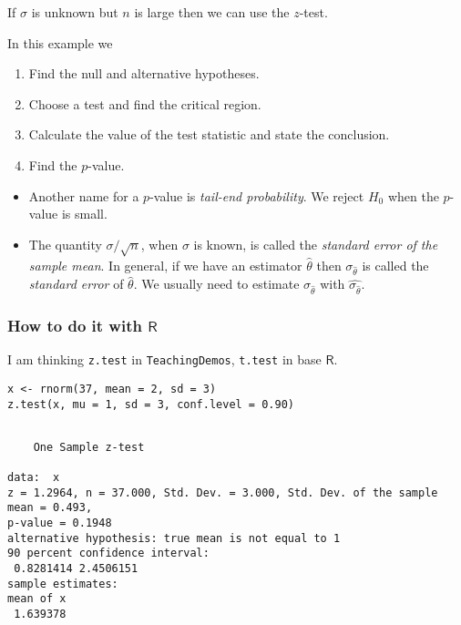 \begin{rem}
If \(\sigma\) is unknown but \(n\) is large then we can use the
\(z\)-test.
\end{rem}


In this example we
\begin{enumerate}
\item Find the null and alternative hypotheses.
\item Choose a test and find the critical region.
\item Calculate the value of the test statistic and state the conclusion.
\item Find the \(p\)-value.
\end{enumerate}



\begin{rem}
\begin{itemize}
\item Another name for a \(p\)-value is \emph{tail-end probability}. We reject
\(H_{0}\) when the \(p\)-value is small.
\item The quantity \(\sigma/\sqrt{n}\), when \(\sigma\) is known, is
called the \emph{standard error of the sample mean}. In general, if we
have an estimator \(\hat{\theta}\) then \(\sigma_{\hat{\theta}}\) is
called the \emph{standard error} of \(\hat{\theta}\). We usually need to
estimate \(\sigma_{\hat{\theta}}\) with
\(\hat{\sigma_{\hat{\theta}}}\).
\end{itemize}
\end{rem}

\subsubsection{How to do it with \(\mathsf{R}\)}
\label{sec-10-3-1-1}

I am thinking \texttt{z.test}  in
\texttt{TeachingDemos}, \texttt{t.test}  in base
\(\mathsf{R}\).

\begin{verbatim}
x <- rnorm(37, mean = 2, sd = 3)
z.test(x, mu = 1, sd = 3, conf.level = 0.90)
\end{verbatim}

\begin{verbatim}

	One Sample z-test

data:  x
z = 1.2964, n = 37.000, Std. Dev. = 3.000, Std. Dev. of the sample mean = 0.493,
p-value = 0.1948
alternative hypothesis: true mean is not equal to 1
90 percent confidence interval:
 0.8281414 2.4506151
sample estimates:
mean of x 
 1.639378
\end{verbatim}

